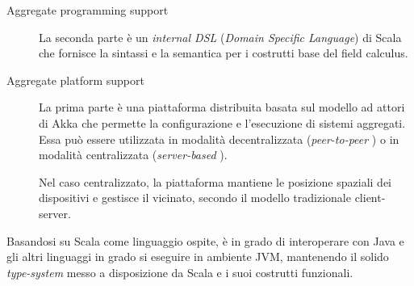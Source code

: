 \begin{description}
  \item[Aggregate programming support]
    La seconda parte è un \emph{internal DSL} (\emph{Domain Specific Language}) di Scala che fornisce la sintassi e la semantica per i costrutti base del field calculus.

  \item[Aggregate platform support]
    La prima parte è una piattaforma distribuita basata sul modello ad attori di Akka che permette la configurazione e l'esecuzione di sistemi aggregati.
    Essa può essere utilizzata in modalità decentralizzata (\emph{peer-to-peer} %
    ) o in modalità centralizzata (\emph{server-based}%
    ).                                                                                                  %



    Nel caso centralizzato, la piattaforma mantiene le posizione spaziali dei dispositivi e gestisce il vicinato, secondo il modello tradizionale client-server.
\end{description}

Basandosi su Scala come linguaggio ospite, è in grado di interoperare con Java e gli altri linguaggi in grado si eseguire in ambiente JVM, mantenendo il solido \emph{type-system} messo a disposizione da Scala e i suoi costrutti funzionali.


